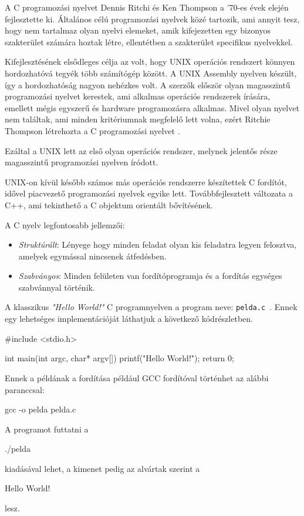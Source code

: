 

A C programozási nyelvet Dennis Ritchi és Ken Thompson a '70-es évek elején fejlesztette ki. Általános célú programozási nyelvek közé tartozik, ami annyit tesz, hogy nem tartalmaz olyan nyelvi elemeket, amik kifejezetten egy bizonyos szakterület számára hoztak létre, ellentétben a szakterület specifikus nyelvekkel.


Kifejlesztésének elsődleges célja az volt, hogy  UNIX operációs rendszert könnyen hordozhatóvá tegyék több számítógép között.
A UNIX Assembly nyelven készült, így a hordozhatóság nagyon nehézkes volt. A szerzők először olyan magasszintű programozási nyelvet kerestek, ami alkalmas operációs rendszerek írására, emellett mégis egyszerű és hardware programozásra alkalmas. Mivel olyan nyelvet nem találtak, ami minden kritériumnak megfelelő lett volna, ezért Ritchie Thompson létrehozta a C programozási nyelvet \cite{brian1978thec}.

Ezáltal a UNIX lett az első olyan operációs rendszer, melynek jelentős része magasszintű programozási nyelven íródott.

UNIX-on kívül később számos más operációs rendszerre készítettek C fordítót, idővel piacvezető programozási nyelvek egyike lett.
Továbbfejlesztett változata a C++, ami tekinthető a C objektum orientált bővítésének.

A C nyelv legfontosabb jellemzői:
\begin{itemize}
\item \textit{Struktúrált}:
Lényege hogy minden feladat olyan kis feladatra legyen felosztva, amelyek egymással nincsenek átfedésben.
\item \textit{Szabványos}:
Minden felületen van fordítóprogramja és a fordítás egységes szabvánnyal történik.
\end{itemize}

A klasszikus \textit{"Hello World!"} C programnyelven a program neve: \texttt{pelda.c }. Ennek egy lehetséges implementációját láthatjuk a következő kódrészletben.
\begin{cpp}
#include <stdio.h>

int main(int argc, char* argv[])
{
    printf("Hello World!\n");
    return 0;
} 
\end{cpp}
Ennek a példának a fordítása például GCC fordítóval történhet az alábbi paranccsal:
\begin{cpp}
gcc -o pelda pelda.c
\end{cpp}
A programot futtatni a
\begin{cpp}
./pelda
\end{cpp}
kiadásával lehet, a kimenet pedig az alvártak szerint a
\begin{cpp}
Hello World!
\end{cpp}
lesz.

